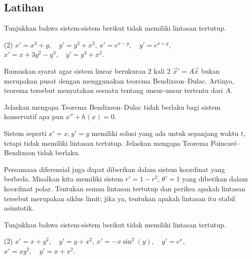 \subsection{Latihan}

\begin{exercise}
Tunjukkan bahwa sistem-sistem berikut tidak memiliki lintasan tertutup.
\begin{tasks}(2)
\task $x'=x^3+y,\quad y'=y^3+x^2$,
\task $x'=e^{x-y},\quad y'=e^{x+y}$,
\task $x'=x+3y^2-y^3,\quad y'=y^3+x^2$.
\end{tasks}
\end{exercise}

\begin{exercise}
Rumuskan syarat agar sistem linear berukuran 2 kali 2
${\vec{x}}' = A \vec{x}$ bukan merupakan pusat dengan menggunakan
teorema Bendixson--Dulac. Artinya, teorema tersebut menyatakan sesuatu
tentang unsur-unsur tertentu dari $A$.
\end{exercise}

\begin{exercise}
Jelaskan mengapa Teorema Bendixson--Dulac tidak berlaku bagi sistem
konservatif apa pun $x''+h(x) = 0$.
\end{exercise}

\begin{exercise}
Sistem seperti $x'=x, y'=y$ memiliki solusi yang ada untuk sepanjang waktu
$t$, tetapi tidak memiliki lintasan tertutup. Jelaskan mengapa Teorema
Poincar\'e--Bendixson tidak berlaku.
\end{exercise}

\begin{exercise}
Persamaan diferensial juga dapat diberikan dalam sistem koordinat yang
berbeda. Misalkan kita memiliki sistem $r' = 1-r^2$, $\theta' = 1$ yang
diberikan dalam koordinat polar. Tentukan semua lintasan tertutup dan
periksa apakah lintasan tersebut merupakan siklus limit; jika ya, tentukan
apakah lintasan itu stabil asimtotik.
\end{exercise}


\setcounter{exercise}{100}

\begin{exercise}
Tunjukkan bahwa sistem-sistem berikut tidak memiliki lintasan tertutup.
\begin{tasks}(2)
\task $x'=x+y^2,\quad y'=y+x^2$,
\task $x'=-x\sin^2(y),\quad y'=e^x$,
\task $x'=xy^2,\quad y'=x+x^2$.
\end{tasks}
\end{exercise}

